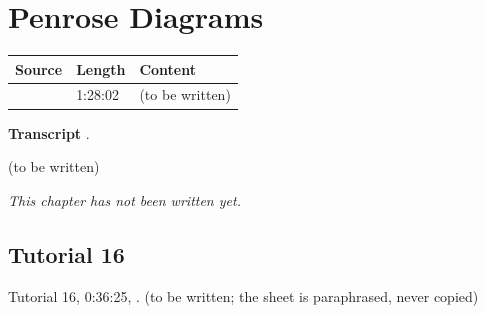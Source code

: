 \chapter{Penrose Diagrams}\label{ch:c23}
\begin{paracol}{2}

\begin{sources}
\begin{tabularx}{\linewidth}{@{}l l L@{}}
\toprule
\textbf{Source} & \textbf{Length} & \textbf{Content}\\
\midrule
{} & 1:28:02 & (to be written)\\
\bottomrule
\end{tabularx}

\smallskip
\textbf{Transcript} .
\end{sources}

\begin{reading}
(to be written)
\end{reading}

\emph{This chapter has not been written yet.}

\section{Tutorial 16}\label{sec:t23-1}
Tutorial 16, 0:36:25, . (to be written; the sheet is paraphrased, never copied)

\flushside
\end{paracol}
